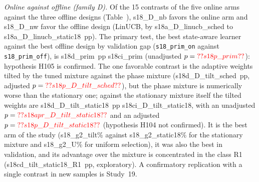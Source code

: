 \emph{Online against offline (family D).} Of the 15 contrasts of the five online arms against the three offline designs (Table~), \num{s18_D_nb} favors the online arm and \num{s18_D_nw} favor the offline design (LinUCB, by \num{s18a_D_linucb_sched} to \num{s18a_D_linucb_static18}~pp). The primary test, the best state-aware learner against the best offline design by validation gap (\texttt{\num{s18_prim_on}} against \texttt{\num{s18_prim_off}}), is \num{s18d_prim}~pp \num{s18ci_prim} (unadjusted $p=\num{s18p_prim}$): hypothesis H105 is confirmed. The one favorable contrast is the adaptive weights tilted by the tuned mixture against the phase mixture (\num{s18d_D_tilt_sched}~pp, adjusted $p=\num{s18p_D_tilt_sched}$), but the phase mixture is numerically worse than the stationary one; against the stationary mixture itself the tilted weights are \num{s18d_D_tilt_static18}~pp \num{s18ci_D_tilt_static18}, with an unadjusted $p=\num{s18apr_D_tilt_static18}$ and an adjusted $p=\num{s18p_D_tilt_static18}$ (hypothesis H104 not confirmed). It is the best arm of the study (\num{s18_g2_tilt}\% against \num{s18_g2_static18}\% for the stationary mixture and \num{s18_g2_U}\% for uniform selection), it was also the best in validation, and its advantage over the mixture is concentrated in the class R1 (\num{s18cd_tilt_static18_R1}~pp, exploratory). A confirmatory replication with a single contrast in new samples is Study~19.






